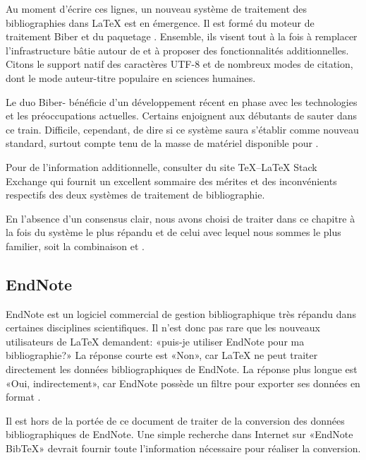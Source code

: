 Au moment d'écrire ces lignes, un nouveau système de traitement des
bibliographies dans {\LaTeX} est en émergence. Il est formé du moteur
de traitement Biber \citep{biber} et du paquetage 
\citep{biblatex}. Ensemble, ils visent tout à la fois à remplacer
l'infrastructure bâtie autour de {\BibTeX} et à proposer des
fonctionnalités additionnelles. Citons le support natif des caractères
UTF-8 et de nombreux modes de citation, dont le mode
auteur-titre populaire en sciences humaines.

Le duo Biber- bénéficie d'un développement récent en
phase avec les technologies et les préoccupations actuelles. Certains
enjoignent aux débutants de sauter dans ce train. Difficile,
cependant, de dire si ce système saura s'établir comme nouveau
standard, surtout compte tenu de la masse de matériel disponible pour
{\BibTeX}.

Pour de l'information additionnelle, consulter %
du site {\TeX}--{\LaTeX} Stack Exchange qui fournit un excellent
sommaire des mérites et des inconvénients respectifs des deux systèmes
de traitement de bibliographie.

En l'absence d'un consensus clair, nous avons choisi de traiter dans
ce chapitre à la fois du système le plus répandu et de celui avec
lequel nous sommes le plus familier, soit la combinaison {\BibTeX} et
.

\subsection{EndNote}
\label{sec:bibliographie:systeme:endnote}

EndNote est un logiciel commercial de gestion bibliographique très
répandu dans certaines disciplines scientifiques. Il n'est donc pas
rare que les nouveaux utilisateurs de {\LaTeX} demandent: «puis-je
utiliser EndNote pour ma bibliographie?» La réponse courte est «Non»,
car {\LaTeX} ne peut traiter directement les données bibliographiques
de EndNote. La réponse plus longue est «Oui, indirectement»,
car EndNote possède un filtre pour exporter ses données en format
{\BibTeX}.

Il est hors de la portée de ce document de traiter de la conversion
des données bibliographiques de EndNote. Une simple recherche dans
Internet sur «EndNote BibTeX» devrait fournir toute l'information
nécessaire pour réaliser la conversion.


